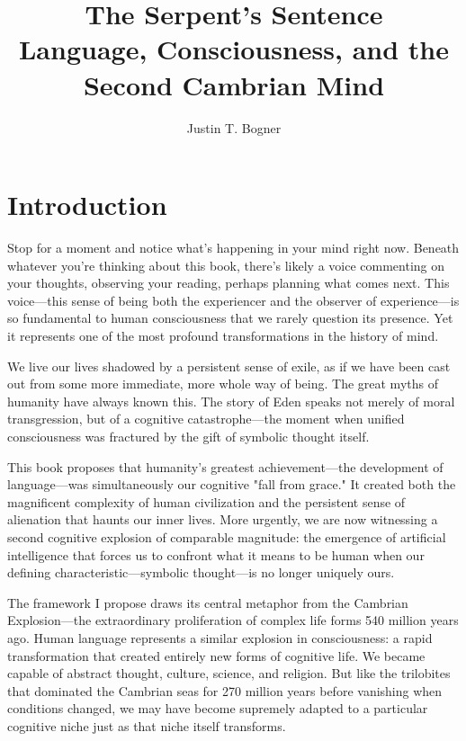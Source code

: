 \documentclass[12pt,letterpaper]{book}
\title{The Serpent's Sentence\\
\large Language, Consciousness, and the Second Cambrian Mind}
\author{Justin T. Bogner}
\date{}
\begin{document}
\frontmatter
\maketitle

\tableofcontents
\newpage

\mainmatter

\chapter*{Introduction}

Stop for a moment and notice what's happening in your mind right now. Beneath whatever you're thinking about this book, there's likely a voice commenting on your thoughts, observing your reading, perhaps planning what comes next. This voice—this sense of being both the experiencer and the observer of experience—is so fundamental to human consciousness that we rarely question its presence. Yet it represents one of the most profound transformations in the history of mind.

We live our lives shadowed by a persistent sense of exile, as if we have been cast out from some more immediate, more whole way of being. The great myths of humanity have always known this. The story of Eden speaks not merely of moral transgression, but of a cognitive catastrophe—the moment when unified consciousness was fractured by the gift of symbolic thought itself.

This book proposes that humanity's greatest achievement—the development of language—was simultaneously our cognitive "fall from grace." It created both the magnificent complexity of human civilization and the persistent sense of alienation that haunts our inner lives. More urgently, we are now witnessing a second cognitive explosion of comparable magnitude: the emergence of artificial intelligence that forces us to confront what it means to be human when our defining characteristic—symbolic thought—is no longer uniquely ours.

The framework I propose draws its central metaphor from the Cambrian Explosion—the extraordinary proliferation of complex life forms 540 million years ago. Human language represents a similar explosion in consciousness: a rapid transformation that created entirely new forms of cognitive life. We became capable of abstract thought, culture, science, and religion. But like the trilobites that dominated the Cambrian seas for 270 million years before vanishing when conditions changed, we may have become supremely adapted to a particular cognitive niche just as that niche itself transforms.
\end{document}
